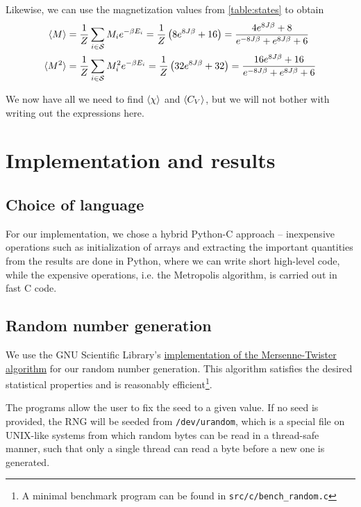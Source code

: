 \documentclass[a4paper]{article}
\begin{document}
Likewise, we can use the magnetization values from \vref{table:states} to obtain
\begin{align}
    \langle M \rangle &= \frac{1}{Z} \sum_{i \in {\mathcal{S}}} M_i e^{-\beta E_i}
    = \frac{1}{Z} \left( 8 e^{8 J \beta} + 16 \right)
    = \frac{4 e^{8 J \beta} + 8}{e^{-8 J \beta} + e^{8 J \beta} + 6}
    \label{eq:mu_M:2} \\
    \langle M^2 \rangle &= \frac{1}{Z} \sum_{i \in {\mathcal{S}}} M_i^2 e^{-\beta E_i}
    = \frac{1}{Z} \left(32 e^{8 J \beta} + 32 \right)
    = \frac{16 e^{8 J \beta} + 16}{e^{-8 J \beta} + e^{8 J \beta} + 6}
    \label{eq:mu_M_sq:2}
\end{align}

We now have all we need to find ${\langle \chi \rangle}$ and ${\langle C_V \rangle}$, but we will not bother with writing out the expressions here.

\section{Implementation and results}\label{sec:implementation_and_results}
\subsection{Choice of language}
For our implementation, we chose a hybrid Python-C approach -- inexpensive operations such as initialization of arrays and extracting the important quantities from the results are done in Python, where we can write short high-level code, while the expensive operations, i.e. the Metropolis algorithm, is carried out in fast C code.

\subsection{Random number generation}
We use the GNU Scientific Library's \href{https://www.gnu.org/software/gsl/manual/html_node/Random-number-generator-algorithms.html}{implementation of the Mersenne-Twister algorithm} for our random number generation. This algorithm satisfies the desired statistical properties and is reasonably efficient\footnote{A minimal benchmark program can be found in \texttt{src/c/bench\_random.c}}.

The programs allow the user to fix the seed to a given value. If no seed is provided, the RNG will be seeded from \texttt{/dev/urandom}, which is a special file on UNIX-like systems from which random bytes can be read in a thread-safe manner, such that only a single thread can read a byte before a new one is generated.
\end{document}
